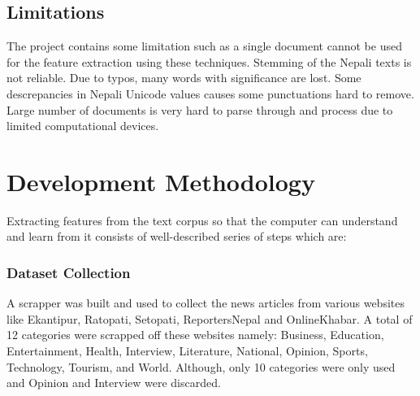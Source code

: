 \documentclass[12pt]{report}
\begin{document}
        \subsection{Limitations}
        The project contains some limitation such as a single document cannot be used for the feature extraction using these techniques.
        Stemming of the Nepali texts is not reliable. Due to typos, many words with significance are lost. Some descrepancies in Nepali Unicode values 
        causes some punctuations hard to remove. Large number of documents is very hard to parse through and process due to limited computational devices.


    \section{Development Methodology}

        Extracting features from the text corpus so that the computer can understand and learn from it consists of well-described
        series of steps which are:
        

        
        \subsubsection{Dataset Collection}
            A scrapper was built and used to collect the news articles from various websites like Ekantipur, Ratopati, Setopati, ReportersNepal and OnlineKhabar.
            A total of 12 categories were scrapped off these websites namely: Business, Education, Entertainment, Health, Interview, 
            Literature, National, Opinion, Sports, Technology, Tourism, and World. Although, only 10 categories were only used and Opinion and Interview were discarded.
\end{document}
